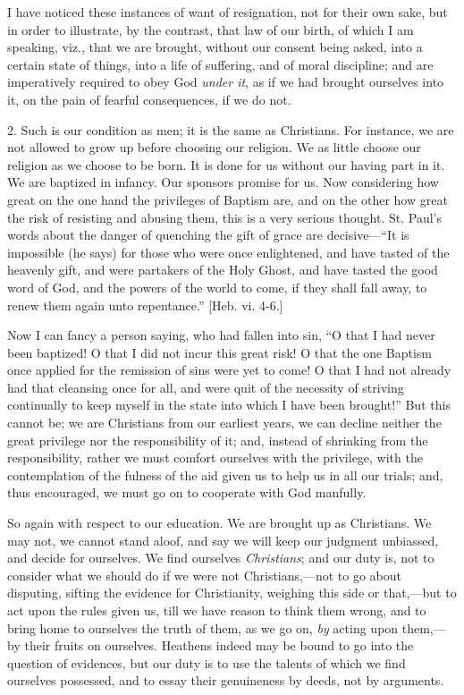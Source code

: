 I have noticed these instances of want of resignation, not for
their own sake, but in order to illustrate, by the contrast, that law
of our birth, of which I am speaking, viz., that we are brought,
without our consent being asked, into a certain state of things, into
a life of suffering, and of moral discipline; and are imperatively
required to obey God \emph{under it}, as if we had brought ourselves
into it, on the pain of fearful consequences, if we do not.

2. Such is our condition as men; it is the same as Christians. For
instance, we are not allowed to grow up before choosing our religion.
We as little choose our religion as we choose to be born. It is done
for us without our having part in it. We are baptized in infancy. Our
sponsors promise for us. Now considering how great on the one hand the
privileges of Baptism are, and on the other how great the risk of
resisting and abusing them, this is a very serious thought. St. Paul's
words about the danger of quenching the gift of grace are decisive—``It
is impossible (he says) for those who were once enlightened, and have
tasted of the heavenly gift, and were partakers of the Holy Ghost, and
have tasted the good word of God, and the powers of the world to come,
if they shall fall away, to renew them again unto repentance.''
[Heb. vi. 4-6.]

Now I can fancy a person saying, who had fallen into sin, ``O
that I had never been baptized! O that I did not incur this great
risk! O that the one Baptism once applied for the remission of sins
were yet to come! O that I had not already had that cleansing once for
all, and were quit of the necessity of striving continually to keep
myself in the state into which I have been brought!'' But this
cannot be; we are Christians from our earliest years, we can decline
neither the great privilege nor the responsibility of it; and, instead
of shrinking from the responsibility, rather we must comfort ourselves
with the privilege, with the contemplation of the fulness of the aid
given us to help us in all our trials; and, thus encouraged, we must
go on to cooperate with God manfully.

So again with respect to our education. We are brought up as
Christians. We may not, we cannot stand aloof, and say we will keep
our judgment unbiassed, and decide for ourselves. We find ourselves \emph{Christians};
and our duty is, not to consider what we should do if we were not
Christians,—not to go about disputing, sifting the evidence for
Christianity, weighing this side or that,—but to act upon the rules
given us, till we have reason to think them wrong, and to bring home
to ourselves the truth of them, as we go on, \emph{by} acting upon
them,—by their fruits on ourselves. Heathens indeed may be bound to
go into the question of evidences, but our duty is to use the talents
of which we find ourselves possessed, and to essay their genuineness
by deeds, not by arguments.

